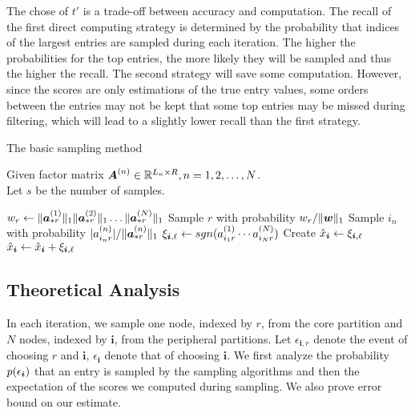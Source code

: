 \documentclass[10pt,journal,compsoc]{IEEEtran}
\newcommand{\Sca}[3]{{#1}^{(#2)}_{i_#2#3}}%
\newcommand{\anr}[2]{\Sca{a}{#1}{#2}}
\newcommand{\score}[1]{\xi_{\V{i},#1}}
\newcommand{\V}[1]{{\boldsymbol{{\MakeLowercase{#1}}}}}
\newcommand{\ColVec}[3]{\V{#1}^{(#2)}_{#3}}
\newcommand{\NormColA}[2]{\norm{\ColVec{a}{#1}{*#2}}{1}}
\newcommand{\ColVecA}[1]{\V{a}^{(#1)}_{*r}}
\newcommand{\coord}{(i_1,i_2,\ldots,i_N)}
\newcommand{\predx}{\hat{x}_{\V{i}}}
\newcommand{\M}[1]{{\boldsymbol{{\MakeUppercase{#1}}}}}
\newcommand{\FacMat}[2]{\M{#1}^{(#2)}}
\newcommand{\norm}[2]{\|#1\|_{#2}}
\begin{document}
The chose of $t'$ is a trade-off between accuracy and computation.
The recall of the first direct computing strategy is determined by the probability
that indices of the largest entries are sampled during each iteration.
The higher the probabilities for the top entries, the more likely they will be sampled
and thus the higher the recall.
The second strategy will save some computation.
However, since the scores are only estimations of the true entry values,
some orders between the entries may not be kept
that some top entries may be missed during filtering,
which will lead to a slightly lower recall than the first strategy.

\begin{algorithm}[!ht]
	\caption{The basic sampling method}
	\label{alg:CoreSampling}
	Given factor matrix $\FacMat{A}{n}\in \mathbb{R}^{L_n\times R}, n = 1,2,\ldots,N$.\\
	Let $s$ be the number of samples.
	\begin{algorithmic}[1]
		\State $w_r \leftarrow \NormColA{1}{r}\NormColA{2}{r}\ldots\NormColA{N}{r}$
		\label{line:Weight}
		\EndFor
		\State Sample $r$ with probability $w_r/\norm{\V{W}}{1}$
		\label{line:CorePartition}
		\label{line:ItemPartitionFor}
		\State Sample $i_n$ with probability $|\anr{n}{r}|/\norm{\ColVecA{n}}{1}$
		\EndFor
		\label{line:ItemPartitionEnd}
		\State
		\label{line:Scoring}
		$\score{\ell} \leftarrow sgn(\anr{1}{r}\cdots\anr{N}{r})$
		\If {$\V{i}=\coord$ has not been sampled}
		\State  Create $\predx \leftarrow \score{\ell} $
		\Else
		\State $\predx \leftarrow \predx + \score{\ell}$
		\EndIf
		\EndFor
		\label{line:ScoringEnd}
	\end{algorithmic}
\end{algorithm}

\subsection{Theoretical Analysis}
In each iteration,
we sample one node, indexed by $r$,
from the core partition and $N$ nodes,
indexed by $\boldsymbol{i}$, from the peripheral partitions.
Let $\epsilon_{\boldsymbol{i},r}$
denote the event of choosing $r$
and $\boldsymbol{i}$, $\epsilon_{\boldsymbol{i}}$ denote that of choosing $\boldsymbol{i}$.
We first analyze the probability $p(\epsilon_{\V{i}})$ that an entry is sampled by the sampling algorithms and then the expectation of the scores we computed during sampling. 
We also prove error bound on our estimate.
\end{document}
